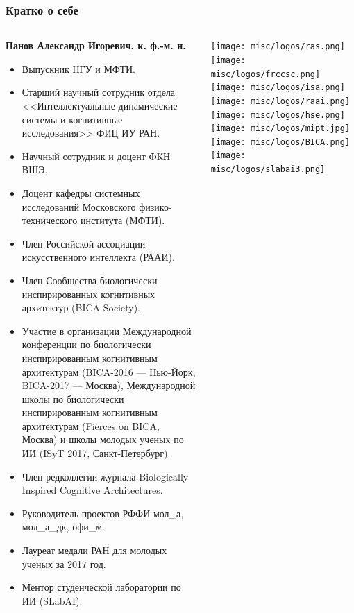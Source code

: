 	\begin{frame}
		\frametitle{Кратко о себе}
		\scriptsize
		\begin{columns}
			\begin{column}{0.85\textwidth}
				\textbf{Панов Александр Игоревич, к. ф.-м. н.}
				\begin{itemize}
					\item Выпускник НГУ и МФТИ.
					\item Старший научный сотрудник отдела <<Интеллектуальные динамические системы и когнитивные исследования>> ФИЦ ИУ РАН.
					\item Научный сотрудник и доцент ФКН ВШЭ.
					\item Доцент кафедры системных исследований Московского физико-технического института (МФТИ).
					\item Член Российской ассоциации искусственного интеллекта (РААИ).
					\item Член Сообщества биологически инспирированных когнитивных архитектур (BICA Society).
					\item Участие в организации Международной конференции по биологически инспирированным когнитивным архитектурам (BICA-2016 --- Нью-Йорк, BICA-2017 --- Москва), Международной школы по биологически инспирированным когнитивным архитектурам (Fierces on BICA, Москва) и школы молодых ученых по ИИ (ISyT 2017, Санкт-Петербург).
					\item Член редколлегии журнала Biologically Inspired Cognitive Architectures.					
					\item Руководитель проектов РФФИ мол\_а, мол\_а\_дк, офи\_м.
					\item Лауреат медали РАН для молодых ученых за 2017 год.
					\item Ментор студенческой лаборатории по ИИ (SLabAI).
				\end{itemize}
			\end{column}
			
			\begin{column}{0.15\textwidth}
				\centering
				\texttt{[image: misc/logos/ras.png]}
				\vspace{7pt}
				\texttt{[image: misc/logos/frccsc.png]}
				\vspace{7pt}
				\texttt{[image: misc/logos/isa.png]}
				\vspace{7pt}
				\texttt{[image: misc/logos/raai.png]}
				\vspace{7pt}
				\texttt{[image: misc/logos/hse.png]}
				\vspace{7pt}
				\texttt{[image: misc/logos/mipt.jpg]}
				\vspace{5pt}
				\texttt{[image: misc/logos/BICA.png]}
				\vspace{5pt}
				\texttt{[image: misc/logos/slabai3.png]}
			\end{column}
			
		\end{columns}
	\end{frame}
		
